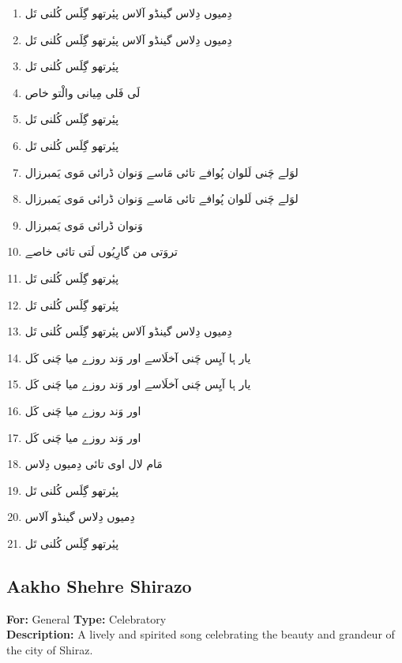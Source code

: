 \documentclass[12pt]{article}
\newcommand{\bigarabic}[1]{\fontsize{16pt}{18pt}\selectfont \textarabic{#1}}
\begin{document}
\begin{multicols}{2}
\begin{RTL}
\begin{enumerate}[leftmargin=*, label=\arabic*., font=\fontsize{16pt}{18pt}\selectfont]
  \item \bigarabic{دِمیوں دِلاس گینڈو آلاس پیٔرتھو گِلَس کُلنی تَل}
  \item \bigarabic{دِمیوں دِلاس گینڈو آلاس پیٔرتھو گِلَس کُلنی تَل}
  \item \bigarabic{پیٔرتھو گِلَس کُلنی تَل}
  \item \bigarabic{لَی فَلی مِیانی والْتو خاص}
  \item \bigarabic{پیٔرتھو گِلَس کُلنی تَل}
  \item \bigarabic{پیٔرتھو گِلَس کُلنی تَل}
  \item \bigarabic{لوَلے چَنی لَلوان پُوافے تائی مَاسے وَنوان ڈرائی مَوی یَمبرزال}
  \item \bigarabic{لوَلے چَنی لَلوان پُوافے تائی مَاسے وَنوان ڈرائی مَوی یَمبرزال}
  \item \bigarabic{وَنوان ڈرائی مَوی یَمبرزال}
  \item \bigarabic{تروَتی من گارِیُوں لَتی تائی خاصے}
  \item \bigarabic{پیٔرتھو گِلَس کُلنی تَل}
  \item \bigarabic{پیٔرتھو گِلَس کُلنی تَل}
  \item \bigarabic{دِمیوں دِلاس گینڈو آلاس پیٔرتھو گِلَس کُلنی تَل}
  \item \bigarabic{یار ہا آیِس چَنی آخلَاسے اور وَند روزے میا چَنی کَل}
  \item \bigarabic{یار ہا آیِس چَنی آخلَاسے اور وَند روزے میا چَنی کَل}
  \item \bigarabic{اور وَند روزے میا چَنی کَل}
  \item \bigarabic{اور وَند روزے میا چَنی کَل}
  \item \bigarabic{مَام لال اوی تائی دِمیوں دِلاس}
  \item \bigarabic{پیٔرتھو گِلَس کُلنی تَل}
  \item \bigarabic{دِمیوں دِلاس گینڈو آلاس}
  \item \bigarabic{پیٔرتھو گِلَس کُلنی تَل}
\end{enumerate}
\end{RTL}
\end{multicols}


\subsection*{Aakho Shehre Shirazo}
\textbf{For:} General \quad \textbf{Type:} Celebratory\\
\textbf{Description:} A lively and spirited song celebrating the beauty and grandeur of the city of Shiraz.
\end{document}
